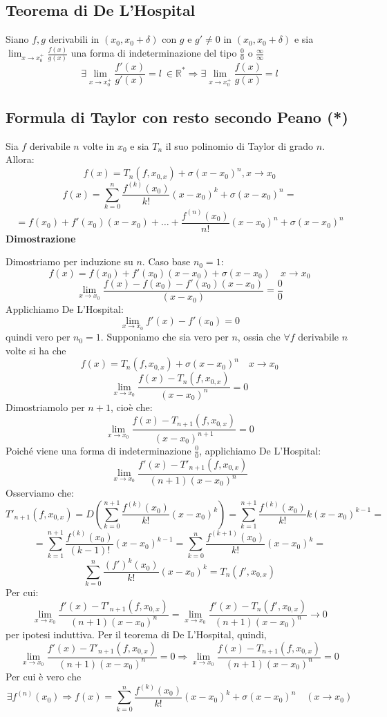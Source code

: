 \documentclass[12pt]{article}
\begin{document}
\subsection{Teorema di De L'Hospital}
Siano $f,g$ derivabili in $(x_0, x_0 + \delta)$
con $g$ e $g' \neq 0$ in $(x_0, x_0 + \delta)$
e sia $\displaystyle \lim_{x \to x^{+}_0} \frac{f(x)}{g(x)}$ una forma
di indeterminazione del tipo $\frac{0}{0}$ o $\frac{\infty}{\infty}$
\[
\exists \lim_{x \to x^{+}_0} \frac{f'(x)}{g'(x)} = l\ \in \mathbb{R}^{*} \Rightarrow \exists \lim_{x \to x^{+}_0} \frac{f(x)}{g(x)} = l
\]

\subsection{Formula di Taylor con resto secondo Peano (*)}
Sia $f$ derivabile $n$ volte in $x_0$ e sia
$T_n$ il suo polinomio di Taylor di grado $n$.
Allora:
\[f(x) = T_n(f,x_{0,x}) + \sigma(x-x_0)^n, x \to x_0\]
\[f(x) = \sum_{k=0}^{n}\frac{f^{(k)}(x_0)}{k!}(x-x_0)^k + \sigma(x-x_0)^n =\]
\[ = f(x_0) + f'(x_0)(x-x_0)+\dots+\frac{f^{(n)}(x_0)}{n!}(x-x_0)^n + \sigma(x-x_0)^n \] \newline
\textbf{Dimostrazione}

Dimostriamo per induzione su $n$. Caso base $n_0 = 1$: 
\[ f(x) = f(x_0) + f'(x_0)(x-x_0)+\sigma(x-x_0) \quad x\to x_0\]
\[ \lim_{x \to x_0} \frac{f(x)-f(x_0) -f'(x_0)(x-x_0)}{(x-x_0)} = \frac{0}{0}\]
Applichiamo De L'Hospital: 
\[ \lim_{x \to x_0} f'(x) - f'(x_0) = 0\] 
quindi vero per $n_0 = 1$. Supponiamo che sia vero per $n$, ossia che 
$\forall f$ derivabile $n$ volte si ha che 
\[f(x) = T_n(f, x_{0,x}) + \sigma(x-x_0)^n \quad x \to x_0 \]
\[ \lim_{x \to x_0} \frac{f(x) - T_{n}(f, x_{0,x})}{(x-x_0)^{n}} = 0\]
Dimostriamolo per $n+1$, cioè che:
\[ \lim_{x \to x_0} \frac{f(x) - T_{n+1}(f, x_{0,x})}{(x-x_0)^{n+1}} = 0 \]
Poiché viene una forma di indeterminazione $\frac{0}{0}$,
applichiamo De L'Hospital:
\[ \lim_{x \to x_0} \frac{f'(x) - T'_{n+1}(f,x_{0,x})}{(n+1)(x-x_0)^n} \]
Osserviamo che:
\[ T'_{n+1}(f,x_{0,x}) = D(\sum_{k=0}^{n+1}\frac{f^{(k)}(x_0)}{k!}(x-x_0)^k) = \sum_{k=1}^{n+1}\frac{f^{(k)}(x_0)}{k!}k(x-x_0)^{k-1} = \]
\[ = \sum_{k=1}^{n+1}\frac{f^{(k)}(x_0)}{(k-1)!}(x-x_0)^{k-1} = \sum_{k=0}^{n}\frac{f^{(k+1)}(x_0)}{k!}(x-x_0)^{k} = \]
\[ \sum_{k=0}^{n}\frac{(f')^k(x_0)}{k!}(x-x_0)^{k} = T_n(f',x_{0,x})\]
Per cui:
\[ \lim_{x \to x_0} \frac{f'(x) - T'_{n+1}(f,x_{0,x})}{(n+1)(x-x_0)^n} = \lim_{x \to x_0} \frac{f'(x) - T_n(f',x_{0,x})}{(n+1)(x-x_0)^n} \to 0\] per ipotesi induttiva. Per il teorema di De L'Hospital, quindi,
\[ \lim_{x \to x_0} \frac{f'(x) - T'_{n+1}(f,x_{0,x})}{(n+1)(x-x_0)^n} = 0 \Rightarrow \lim_{x \to x_0} \frac{f(x) - T_{n+1}(f,x_{0,x})}{(n+1)(x-x_0)^n} = 0\]
Per cui è vero che
\[ \exists f^{(n)}(x_0) \Rightarrow f(x) = \sum_{k=0}^{n}\frac{f^{(k)}(x_0)}{k!}(x-x_0)^k + \sigma (x-x_0)^n \quad (x\to x_0)\]
\end{document}
